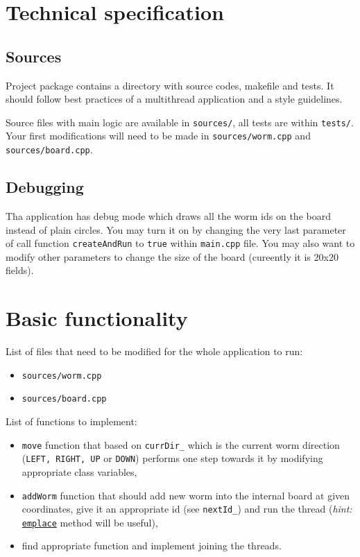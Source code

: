 \documentclass{article}
\begin{document}
\section{Technical specification}

\subsection{Sources}

Project package contains a directory with source codes, makefile and tests.
It should follow best practices of a multithread application and a style
guidelines.

Source files with main logic are available in \texttt{sources/}, all tests
are within \texttt{tests/}. Your first modifications will need to be made
in \texttt{sources/worm.cpp} and \texttt{sources/board.cpp}.

\subsection{Debugging}

Tha application has debug mode which draws all the worm ids on the board
instead of plain circles. You may turn it on by changing the very last
parameter of call function \texttt{createAndRun} to \texttt{true} within
\texttt{main.cpp} file. You may also want to modify other parameters
to change the size of the board (cureently it is 20x20 fields).

\section{Basic functionality}

List of files that need to be modified for the whole application to run:
\begin{itemize}
  \item \texttt{sources/worm.cpp}
  \item \texttt{sources/board.cpp}
\end{itemize}

List of functions to implement:
\begin{itemize}
  \item \texttt{move} function that based on \texttt{currDir\_} which is the
    current worm direction (\texttt{LEFT, RIGHT, UP} or \texttt{DOWN}) performs
    one step towards it by modifying appropriate class variables,
  \item \texttt{addWorm} function that should add new worm into the internal
    board at given coordinates, give it an appropriate id
    (see \texttt{nextId\_}) and run the thread (\textit{hint:}
    \href{https://en.cppreference.com/w/cpp/container/unordered\_map/emplace}{\texttt{emplace}}
    method will be useful),
  \item find appropriate function and implement joining the threads.
\end{itemize}
\end{document}
